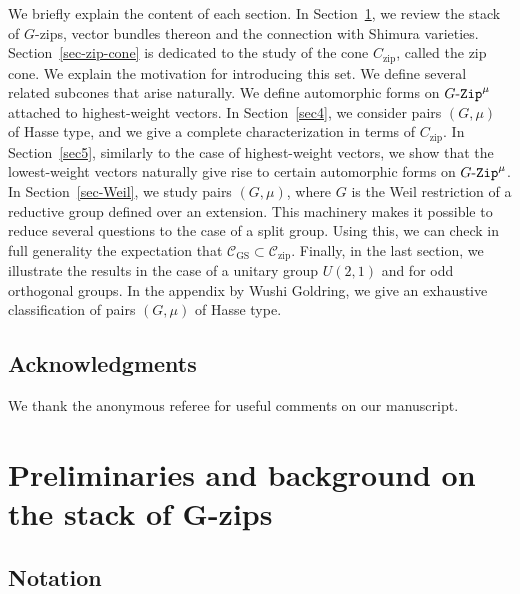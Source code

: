 \documentclass[11pt]{amsart}
\numberwithin{equation}{section}
\theoremstyle{definition}
\theoremstyle{remark}
\newcommand{\GZip}{\mathop{\text{$G$-{\tt Zip}}}\nolimits}
\newcommand{\Ccal}{{\mathcal C}}
\DeclareMathOperator{\zip}{zip} %
\DeclareMathOperator{\GS}{GS}
\begin{document}
We briefly explain the content of each section. In Section~\ref{sec2}, we review the stack of $G$-zips, vector bundles thereon and the connection with Shimura varieties. Section~\ref{sec-zip-cone} is dedicated to the study of the cone $C_{\zip}$, called the zip cone. We explain the motivation for introducing this set. We define several related subcones that arise naturally. We define automorphic forms on $\GZip^\mu$ attached to highest-weight vectors. In Section~\ref{sec4}, we consider pairs $(G,\mu)$ of Hasse type, and we give a complete characterization in terms of $C_{\zip}$. In Section~\ref{sec5}, similarly to the case of highest-weight vectors, we show that the lowest-weight vectors naturally give rise  to certain automorphic forms on $\GZip^\mu$. In Section~\ref{sec-Weil}, we study pairs $(G,\mu)$, where $G$ is the Weil restriction of a reductive group defined over an extension. This machinery makes it possible to reduce several questions to the case of a split group. Using this, we can check in full generality the expectation that $\Ccal_{\GS}\subset \Ccal_{\zip}$. Finally, in the last section, we illustrate the results in the case of a unitary group $U(2,1)$ and for odd orthogonal groups. In the appendix by Wushi Goldring, we give an exhaustive classification of pairs $(G,\mu)$ of Hasse type.


\subsection*{Acknowledgments}
We thank the anonymous referee for useful comments on our manuscript.


\section{Preliminaries and background on the stack of \texorpdfstring{$\boldsymbol{G}$}{G}-zips}\label{sec2}

\subsection{Notation}\label{subsec-notation}
\end{document}
